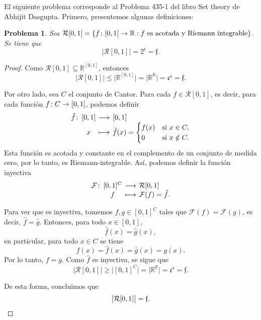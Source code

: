 \documentclass[a4,10pt]{aleph-notas}
\newtheorem*{prob}{Problema}
\begin{document}
\encabezado

\noindent
El siguiente problema corresponde al Problema 435-1 del libro Set theory de Abhijit Dasgupta. Primero, presentemos algunas definiciones:


\begin{prob}
    Sea $\mathcal{R}[0,1] = \{ f\colon [0,1] \rightarrow \mathbb{R} : f\text{ es acotada y Riemann integrable} \}$. Se tiene que 
    \[
        \big|\mathcal{R}[0,1]\big| = 2^{\mathfrak{c}} = \mathfrak{f}.
    \]
\end{prob}

\begin{proof}
    Como $\mathcal{R}[0,1] \subseteq \mathbb{R}^{[0,1]}$, entonces
    \[
        \big|\mathcal{R}[0,1]\big| 
        \leq \big|\mathbb{R}^{[0,1]}\big| 
        = \big|\mathbb{R}^{\mathbb{R}}\big| 
        = \mathfrak{c}^{\mathfrak{c}} = \mathfrak{f}.
    \]
    
    Por otro lado, sea $C$ el conjunto de Cantor. Para cada $f \in \mathcal{R}[0,1]$, es decir, para cada función $f\colon C \rightarrow [0,1]$, podemos definir 
    \[
        \funcion{\hat{f}}{[0,1]}{[0,1]}{x}{
        \hat{f}(x) =
        \begin{cases}
            f(x) & \text{si } x \in C, \\
            0 & \text{si } x \notin C.
        \end{cases}}
    \]
    Esta función es acotada y constante en el complemento de un  conjunto de medida cero, por lo tanto, es Riemann-integrable. Así, podemos definir la función inyectiva 
    \[
        \funcion{\mathcal{F}}{[0,1]^C}{\mathcal{R}[0,1]}{f}{\mathcal{F}(f)=\hat{f}.}
    \]
    
    Para ver que es inyectiva, tomemos $f, g \in [0,1]^C$ tales que $\mathcal{F}(f)=\mathcal{F}(g)$, es decir, $\hat{f} = \hat{g}$. Entonces, para todo $x \in [0,1]$,
    \[
        \hat{f}(x) = \hat{g}(x),
    \]
    en particular, para todo $x \in C$ se tiene 
    \[
        f(x) = \hat{f}(x) = \hat{g}(x) = g(x).
    \]
    Por lo tanto, $f = g$. Como $\hat{f}$ es inyectiva, se sigue que
    \[
        \big|\mathcal{R}[0,1]\big| \geq \big|[0,1]^C\big| = \big|\mathbb{R}^{\mathbb{R}}\big| = \mathfrak{c}^\mathfrak{c}=\mathfrak{f}.
    \]
    
    De esta forma, concluimos que 
    \[
        \big|\mathcal{R}[0,1]\big| = \mathfrak{f}.\qedhere
    \]
\end{proof}

    
\end{document}
